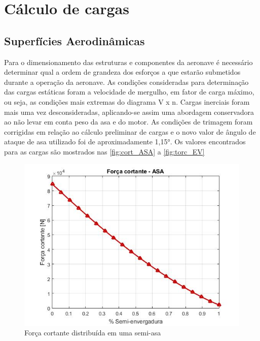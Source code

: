\chapter{Cálculo de cargas}


\section{Superfícies Aerodinâmicas}

Para o dimensionamento das estruturas e componentes da aeronave é necessário determinar qual a ordem de grandeza dos esforços a que estarão submetidos durante a operação da aeronave. As condições consideradas para determinação das cargas estáticas foram a velocidade de mergulho, em fator de carga máximo, ou seja, as condições mais extremas do diagrama V x n. Cargas inerciais foram mais uma vez desconsideradas, aplicando-se assim uma abordagem conservadora ao não levar em conta peso da asa e do motor.
As condições de trimagem foram corrigidas em relação ao cálculo preliminar de cargas e o novo valor de ângulo de ataque de asa utilizado foi de aproximadamente 1,15°.
Os valores encontrados para as cargas são mostrados nas \autoref{fig:cort_ASA} a \autoref{fig:torc_EV}

\begin{figure}
\centering
    \includegraphics[width=\textwidth]{cargas/imagens/cort_ASA.jpg}
\caption{Força cortante distribuída em uma semi-asa}
\label{fig:cort_ASA}
\end{figure}

